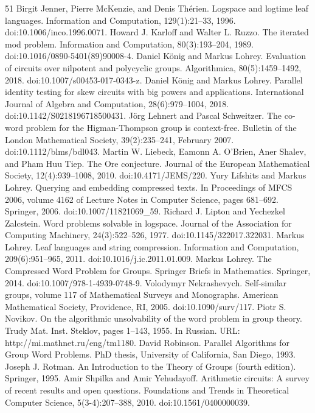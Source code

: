 \documentclass[10pt,a4paper]{article}
\begin{document}
\begin{thebibliography}{51}
 Birgit Jenner, Pierre McKenzie, and Denis Thérien. Logspace and logtime leaf languages. Information and Computation, 129(1):21–33, 1996. doi:10.1006/inco.1996.0071.
 Howard J. Karloff and Walter L. Ruzzo. The iterated mod problem. Information and Computation, 80(3):193–204, 1989. doi:10.1016/0890-5401(89)90008-4.
 Daniel König and Markus Lohrey. Evaluation of circuits over nilpotent and polycyclic groups. Algorithmica, 80(5):1459–1492, 2018. doi:10.1007/s00453-017-0343-z.
 Daniel König and Markus Lohrey. Parallel identity testing for skew circuits with big powers and applications. International Journal of Algebra and Computation, 28(6):979–1004, 2018. doi:10.1142/S0218196718500431.
 Jörg Lehnert and Pascal Schweitzer. The co-word problem for the Higman-Thompson group is context-free. Bulletin of the London Mathematical Society, 39(2):235–241, February 2007. doi:10.1112/blms/bdl043.
 Martin W. Liebeck, Eamonn A. O’Brien, Aner Shalev, and Pham Huu Tiep. The Ore conjecture. Journal of the European Mathematical Society, 12(4):939–1008, 2010. doi:10.4171/JEMS/220.
 Yury Lifshits and Markus Lohrey. Querying and embedding compressed texts. In Proceedings of MFCS 2006, volume 4162 of Lecture Notes in Computer Science, pages 681–692. Springer, 2006. doi:10.1007/11821069\_59.
 Richard J. Lipton and Yechezkel Zalcstein. Word problems solvable in logspace. Journal of the Association for Computing Machinery, 24(3):522–526, 1977. doi:10.1145/322017.322031.
 Markus Lohrey. Leaf languages and string compression. Information and Computation, 209(6):951–965, 2011. doi:10.1016/j.ic.2011.01.009.
 Markus Lohrey. The Compressed Word Problem for Groups. Springer Briefs in Mathematics. Springer, 2014. doi:10.1007/978-1-4939-0748-9.
 Volodymyr Nekrashevych. Self-similar groups, volume 117 of Mathematical Surveys and Monographs. American Mathematical Society, Providence, RI, 2005. doi:10.1090/surv/117.
 Piotr S. Novikov. On the algorithmic unsolvability of the word problem in group theory. Trudy Mat. Inst. Steklov, pages 1–143, 1955. In Russian. URL: http://mi.mathnet.ru/eng/tm1180.
 David Robinson. Parallel Algorithms for Group Word Problems. PhD thesis, University of California, San Diego, 1993.
 Joseph J. Rotman. An Introduction to the Theory of Groups (fourth edition). Springer, 1995.
 Amir Shpilka and Amir Yehudayoff. Arithmetic circuits: A survey of recent results and open questions. Foundations and Trends in Theoretical Computer Science, 5(3-4):207–388, 2010. doi:10.1561/0400000039.

\end{thebibliography}
\end{document}
